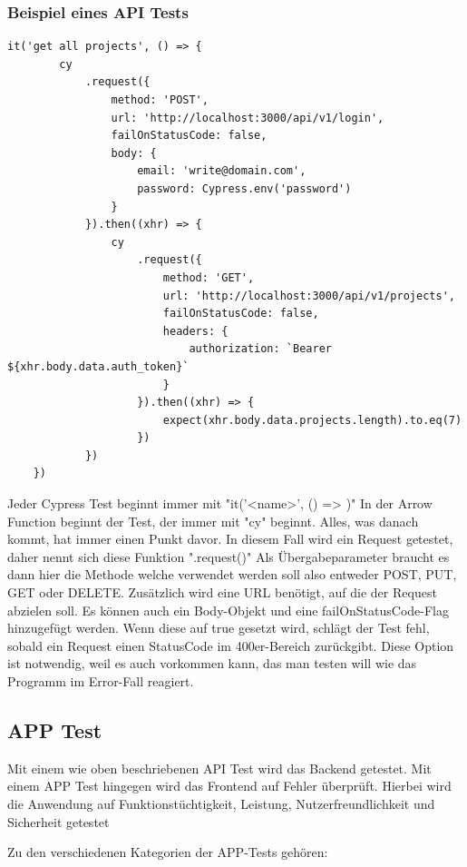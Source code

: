 \newpage
\subsubsection{Beispiel eines API Tests}
\begin{lstlisting}[caption=API Test]
it('get all projects', () => {
        cy
            .request({
                method: 'POST',
                url: 'http://localhost:3000/api/v1/login',
                failOnStatusCode: false,
                body: {
                    email: 'write@domain.com',
                    password: Cypress.env('password')
                }
            }).then((xhr) => {
                cy
                    .request({
                        method: 'GET',
                        url: 'http://localhost:3000/api/v1/projects',
                        failOnStatusCode: false,
                        headers: {
                            authorization: `Bearer ${xhr.body.data.auth_token}`
                        }
                    }).then((xhr) => {
                        expect(xhr.body.data.projects.length).to.eq(7)
                    })
            })
    })
\end{lstlisting}

Jeder Cypress Test beginnt immer mit "it('<name>', () => {})" In der Arrow Function beginnt der Test, der immer mit "cy" beginnt. Alles, was danach kommt, hat immer einen Punkt davor. In diesem Fall wird ein Request getestet, daher nennt sich diese Funktion ".request({})" Als Übergabeparameter braucht es dann hier die Methode welche verwendet werden soll also entweder POST, PUT, GET oder DELETE. Zusätzlich wird eine URL benötigt, auf die der Request abzielen soll. Es können auch ein Body-Objekt und eine failOnStatusCode-Flag hinzugefügt werden. Wenn diese auf true gesetzt wird, schlägt der Test fehl, sobald ein Request einen StatusCode im 400er-Bereich zurückgibt. Diese Option ist notwendig, weil es auch vorkommen kann, das man testen will wie das Programm im Error-Fall reagiert.
\cite{API_Tests}
\subsection{APP Test}
Mit einem wie oben beschriebenen API Test wird das Backend getestet. Mit einem APP Test hingegen wird das Frontend auf Fehler überprüft. Hierbei wird die Anwendung auf Funktionstüchtigkeit, Leistung, Nutzerfreundlichkeit und Sicherheit getestet

Zu den verschiedenen Kategorien der APP-Tests gehören:

